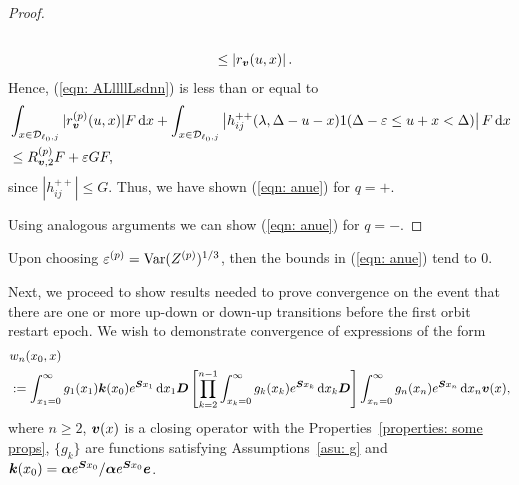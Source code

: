 \begin{proof}
\begin{align}
					\\&\leq \left| r_{\boldsymbol v}(u,x) \right|.
				\end{align}
				Hence, (\ref{eqn: ALllllLsdnn}) is less than or equal to 
                \begin{align}
                	& \int_{x\in\mathcal{D}_{\ell_0,j}} |r_{\boldsymbol v}^{(p)}(u,x)| F \, \mathrm{d} x
                	+ \int_{x\in\mathcal{D}_{\ell_0,j}} \left| h_{ij}^{++}(\lambda,\Delta-u-x) 1(\Delta-\varepsilon \leq u+x < \Delta) \right| F \, \mathrm{d} x\nonumber 
                	\\&\leq R^{(p)}_{{\boldsymbol v},2} F + \varepsilon GF, \nonumber 
                \end{align}
				since \(|h_{ij}^{++}|\leq G\). Thus, we have shown (\ref{eqn: anue}) for \(q=+\). 

                Using analogous arguments we can show  (\ref{eqn: anue}) for \(q=-\).
\end{proof}
Upon choosing \(\varepsilon^{(p)}=\mathrm{Var}(Z^{(p)})^{1/3}\), then the bounds in (\ref{eqn: anue}) tend to 0. 

Next, we proceed to show results needed to prove convergence on the event that there are one or more up-down or down-up transitions before the first orbit restart epoch. We wish to demonstrate convergence of expressions of the form
\begin{align}
	&w_n(x_0,x) \nonumber
	\\&:=\int_{x_1=0}^\infty g_1(x_1) \boldsymbol k(x_0) e^{\boldsymbol{S}x_1}\, \mathrm{d} x_1\boldsymbol D 
			\left[\prod_{k=2}^{n-1}\int_{x_k=0}^\infty g_k(x_k) e^{\boldsymbol{S}x_k} \, \mathrm{d} x_k \boldsymbol D\right] \int_{x_n=0}^\infty g_{n}(x_n) e^{\boldsymbol{S}x_n} \, \mathrm{d} x_n {\boldsymbol v}(x), \label{eqn: salkdjgaf} 
\end{align}
where \(n\geq 2\), \(\boldsymbol v(x)\) is a closing operator with the Properties~\ref{properties: some props}, \(\{g_k\}\) are functions satisfying Assumptions~\ref{asu: g} and \(\boldsymbol k(x_0)=\boldsymbol\alpha e^{\boldsymbol Sx_0}/\boldsymbol\alpha e^{\boldsymbol Sx_0}\boldsymbol e\). 

